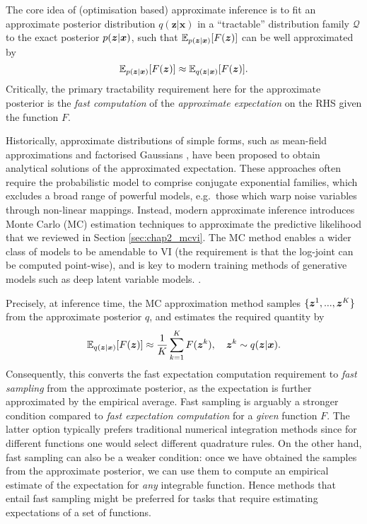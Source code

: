 %
The core idea of (optimisation based) approximate inference is to fit an approximate posterior distribution $q(\bm{z}|\bm{x})$ in a ``tractable'' distribution family $\mathcal{Q}$ to the exact posterior $p(\bm{z} | \bm{x})$, such that $\mathbb{E}_{p(\bm{z}|\bm{x})}[F(\bm{z})]$ can be well approximated by
\begin{equation}
\mathbb{E}_{p(\bm{z}|\bm{x})}[F(\bm{z})] \approx \mathbb{E}_{q(\bm{z}|\bm{x})}[F(\bm{z})]. 
\label{eq:chap5_approx_predict}
\end{equation}
Critically, the primary tractability requirement here for the approximate posterior is the \emph{fast computation} of the \emph{approximate expectation} on the RHS given the function $F$.

Historically, approximate distributions of simple forms, such as mean-field approximations and factorised Gaussians \citep{jordan:vi1999}, have been proposed to obtain analytical solutions of the approximated expectation. These approaches often require the probabilistic model to comprise conjugate exponential families, which excludes a broad range of powerful models, e.g.~those which warp noise variables through non-linear mappings. Instead, modern approximate inference introduces Monte Carlo (MC) estimation techniques to approximate the predictive likelihood \citep{paisley:bbvi2012,ranganath:bbvi2014} that we reviewed in Section \ref{sec:chap2_mcvi}. The MC method enables a wider class of models to be amendable to VI (the requirement is that the log-joint can be computed point-wise), and is key to modern training methods of generative models such as deep latent variable models. \citep{kingma:vae2014, rezende:vae2014}.
%

Precisely, at inference time, the MC approximation method samples $\{\bm{z}^1, ..., \bm{z}^K \}$ from the approximate posterior $q$, and estimates the required quantity by
\begin{equation}
\mathbb{E}_{q(\bm{z}|\bm{x})}[F(\bm{z})] \approx \frac{1}{K} \sum_{k=1}^K F(\bm{z}^k), \quad \bm{z}^k \sim q(\bm{z}|\bm{x}).
\label{eq:chap5_approx_predict_mc}
\end{equation}
Consequently, this converts the fast expectation computation requirement to \emph{fast sampling} from the approximate posterior, as the expectation is further approximated by the empirical average. Fast sampling is arguably a stronger condition compared to \emph{fast expectation computation} for a \emph{given} function $F$. 
%
The latter option typically prefers traditional numerical integration methods since for different functions one would select different quadrature rules. On the other hand, fast sampling can also be a weaker condition: once we have obtained the samples from the approximate posterior, we can use them to compute an empirical estimate of the expectation for \emph{any} integrable function. Hence methods that entail fast sampling might be preferred for tasks that require estimating expectations of a set of functions.

